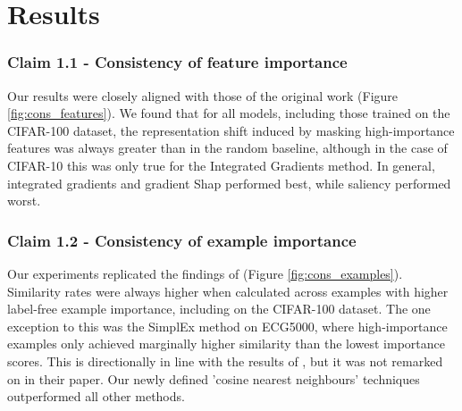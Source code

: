 \section{Results}
\label{sec:results}



\subsubsection{Claim 1.1 - Consistency of feature importance}

Our results were closely aligned with those of the original work (Figure \ref{fig:cons_features}). We found that for all models, including those trained on the CIFAR-100 dataset, the representation shift induced by masking high-importance features was always greater than in the random baseline, although in the case of CIFAR-10 this was only true for the Integrated Gradients method. In general, integrated gradients and gradient Shap performed best, while saliency performed worst.




\subsubsection{Claim 1.2 - Consistency of example importance}


Our experiments replicated the findings of \citet{crabbe2022label} (Figure \ref{fig:cons_examples}{}). Similarity rates were always higher when calculated across examples with higher label-free example importance, including on the CIFAR-100 dataset. The one exception to this was the SimplEx method on ECG5000, where high-importance examples only achieved marginally higher similarity than the lowest importance scores. This is directionally in line with the results of \citet{crabbe2022label}, but it was not remarked on in their paper. Our newly defined 'cosine nearest neighbours' techniques outperformed all other methods.


